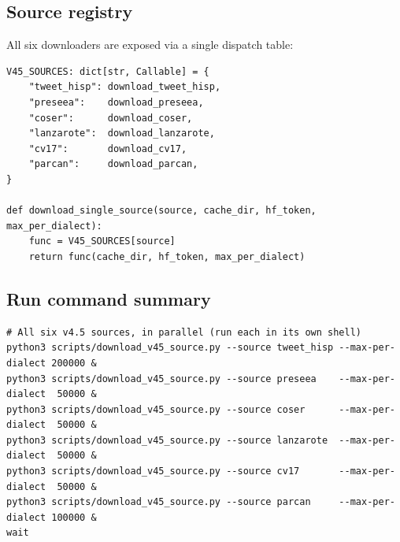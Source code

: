 \documentclass[11pt,a4paper]{article}
\begin{document}
\subsection{Source registry}

All six downloaders are exposed via a single dispatch table:

\begin{lstlisting}[style=pycode]
V45_SOURCES: dict[str, Callable] = {
    "tweet_hisp": download_tweet_hisp,
    "preseea":    download_preseea,
    "coser":      download_coser,
    "lanzarote":  download_lanzarote,
    "cv17":       download_cv17,
    "parcan":     download_parcan,
}

def download_single_source(source, cache_dir, hf_token, max_per_dialect):
    func = V45_SOURCES[source]
    return func(cache_dir, hf_token, max_per_dialect)
\end{lstlisting}

\subsection{Run command summary}

\begin{lstlisting}[style=shellcode]
# All six v4.5 sources, in parallel (run each in its own shell)
python3 scripts/download_v45_source.py --source tweet_hisp --max-per-dialect 200000 &
python3 scripts/download_v45_source.py --source preseea    --max-per-dialect  50000 &
python3 scripts/download_v45_source.py --source coser      --max-per-dialect  50000 &
python3 scripts/download_v45_source.py --source lanzarote  --max-per-dialect  50000 &
python3 scripts/download_v45_source.py --source cv17       --max-per-dialect  50000 &
python3 scripts/download_v45_source.py --source parcan     --max-per-dialect 100000 &
wait
\end{lstlisting}
\end{document}

